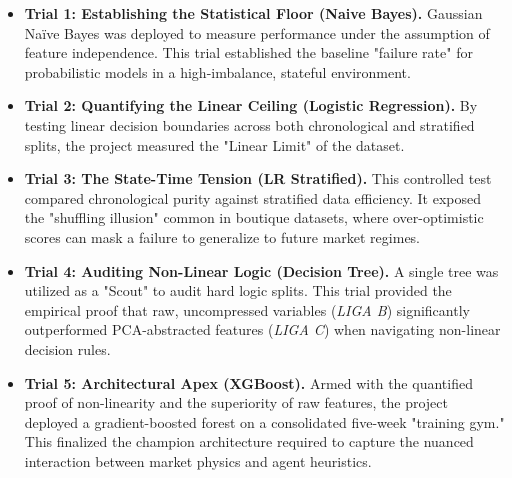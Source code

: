 \begin{itemize}[leftmargin=0.5cm, labelsep=0.3cm]
    \item \textbf{Trial 1: Establishing the Statistical Floor (Naive Bayes).} Gaussian Naïve Bayes was deployed to measure performance under the assumption of feature independence. This trial established the baseline "failure rate" for probabilistic models in a high-imbalance, stateful environment.
    
    \item \textbf{Trial 2: Quantifying the Linear Ceiling (Logistic Regression).} By testing linear decision boundaries across both chronological and stratified splits, the project measured the "Linear Limit" of the dataset. 
    
    \item \textbf{Trial 3: The State-Time Tension (LR Stratified).} This controlled test compared chronological purity against stratified data efficiency. It exposed the "shuffling illusion" common in boutique datasets, where over-optimistic scores can mask a failure to generalize to future market regimes.
    
    \item \textbf{Trial 4: Auditing Non-Linear Logic (Decision Tree).} A single tree was utilized as a "Scout" to audit hard logic splits. This trial provided the empirical proof that raw, uncompressed variables (\textit{LIGA B}) significantly outperformed PCA-abstracted features (\textit{LIGA C}) when navigating non-linear decision rules.
    
    \item \textbf{Trial 5: Architectural Apex (XGBoost).} Armed with the quantified proof of non-linearity and the superiority of raw features, the project deployed a gradient-boosted forest on a consolidated five-week "training gym." This finalized the champion architecture required to capture the nuanced interaction between market physics and agent heuristics.
\end{itemize}


